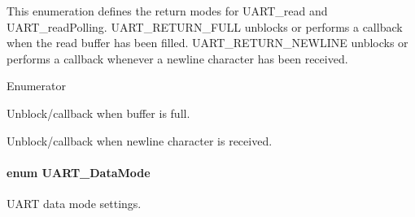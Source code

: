 This enumeration defines the return modes for U\+A\+R\+T\+\_\+read and U\+A\+R\+T\+\_\+read\+Polling. U\+A\+R\+T\+\_\+\+R\+E\+T\+U\+R\+N\+\_\+\+F\+U\+L\+L unblocks or performs a callback when the read buffer has been filled. U\+A\+R\+T\+\_\+\+R\+E\+T\+U\+R\+N\+\_\+\+N\+E\+W\+L\+I\+N\+E unblocks or performs a callback whenever a newline character has been received. \begin{Desc}
\item[Enumerator]\par
\begin{description}
\item[{\em 
U\+A\+R\+T\+\_\+\+R\+E\+T\+U\+R\+N\+\_\+\+F\+U\+L\+L\label{_u_a_r_t_8h_acb5a82843435a1b5d51b6c27028d914fa50c07cbaf7518a0acd14137e801687e5}
}]Unblock/callback when buffer is full. \item[{\em 
U\+A\+R\+T\+\_\+\+R\+E\+T\+U\+R\+N\+\_\+\+N\+E\+W\+L\+I\+N\+E\label{_u_a_r_t_8h_acb5a82843435a1b5d51b6c27028d914fa3b8e419e0e12abf80b25f72d17745f76}
}]Unblock/callback when newline character is received. \end{description}
\end{Desc}
\paragraph[{U\+A\+R\+T\+\_\+\+Data\+Mode}]{\setlength{\rightskip}{0pt plus 5cm}enum {\bf U\+A\+R\+T\+\_\+\+Data\+Mode}}\label{_u_a_r_t_8h_a694090fdb166f94ac30b809f9cba87b8}


U\+A\+R\+T data mode settings. 

